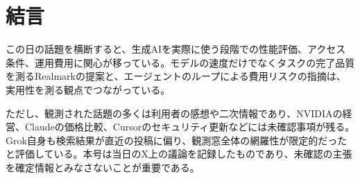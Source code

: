 \section{結言}
この日の話題を横断すると、生成AIを実際に使う段階での性能評価、アクセス条件、運用費用に関心が移っている。モデルの速度だけでなくタスクの完了品質を測るRealmarkの提案と、エージェントのループによる費用リスクの指摘は、実用性を測る観点でつながっている。

ただし、観測された話題の多くは利用者の感想や二次情報であり、NVIDIAの経営、Claudeの価格比較、Cursorのセキュリティ更新などには未確認事項が残る。Grok自身も検索結果が直近の投稿に偏り、観測窓全体の網羅性が限定的だったと評価している。本号は当日のX上の議論を記録したものであり、未確認の主張を確定情報とみなさないことが重要である。
